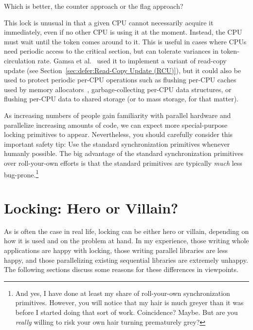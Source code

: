 \QuickQuiz{}
	Which is better, the counter approach or the flag approach?
 \QuickQuizEnd

This lock is unusual in that a given CPU cannot necessarily acquire it
immediately, even if no other CPU is using it at the moment.
Instead, the CPU must wait until the token comes around to it.
This is useful in cases where CPUs need periodic access to the critical
section, but can tolerate variances in token-circulation rate.
Gamsa et al.~\cite{Gamsa99} used it to implement a variant of
read-copy update (see Section~\ref{sec:defer:Read-Copy Update (RCU)}),
but it could also be used to protect periodic per-CPU operations such
as flushing per-CPU caches used by memory allocators~\cite{McKenney93},
garbage-collecting per-CPU data structures, or flushing per-CPU
data to shared storage (or to mass storage, for that matter).

As increasing numbers of people gain familiarity with parallel hardware
and parallelize increasing amounts of code, we can expect more
special-purpose locking primitives to appear.
Nevertheless, you should carefully consider this important safety tip:
Use the standard synchronization primitives whenever humanly possible.
The big advantage of the standard synchronization primitives over
roll-your-own efforts is that the standard primitives are typically
\emph{much} less bug-prone.\footnote{
	And yes, I have done at least my share of roll-your-own
	synchronization primitives.
	However, you will notice that my hair is much greyer than
	it was before I started doing that sort of work.
	Coincidence?
	Maybe.
	But are you \emph{really} willing to risk your own hair turning
	prematurely grey?}



\section{Locking: Hero or Villain?}
\label{sec:locking:Locking: Hero or Villain?}

As is often the case in real life, locking can be either hero or villain,
depending on how it is used and on the problem at hand.
In my experience, those writing whole applications are happy with
locking, those writing parallel libraries are less happy, and those
parallelizing existing sequential libraries are extremely unhappy.
The following sections discuss some reasons for these differences in
viewpoints.

